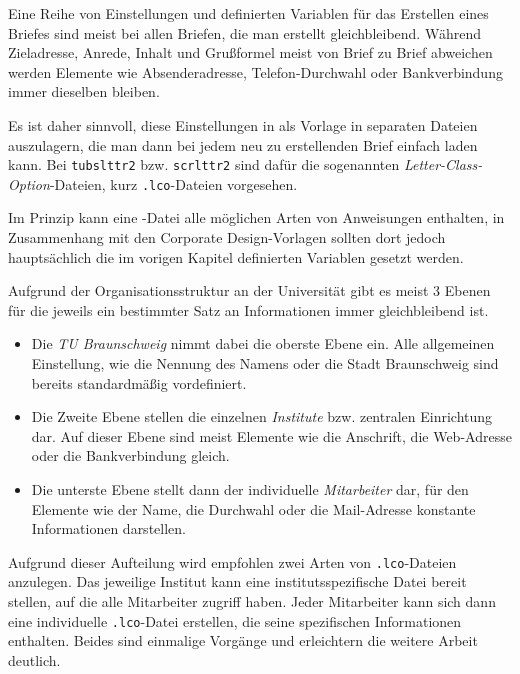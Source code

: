 Eine Reihe von Einstellungen und definierten Variablen für das Erstellen eines
Briefes sind meist bei allen Briefen, die man erstellt gleichbleibend.
Während Zieladresse, Anrede, Inhalt und Grußformel meist von Brief zu Brief
abweichen werden Elemente wie Absenderadresse, Telefon-Durchwahl oder
Bankverbindung immer dieselben bleiben.

Es ist daher sinnvoll, diese Einstellungen in als Vorlage in separaten Dateien
auszulagern, die man dann bei jedem neu zu erstellenden Brief einfach laden
kann. Bei \texttt{tubslttr2} bzw. \texttt{scrlttr2} sind dafür die sogenannten
\emph{Letter-Class-Option}-Dateien, kurz \texttt{.lco}-Dateien vorgesehen.

Im Prinzip kann eine -Datei alle möglichen Arten von Anweisungen
enthalten, in Zusammenhang mit den Corporate Design-Vorlagen sollten dort jedoch
hauptsächlich die im vorigen Kapitel definierten Variablen gesetzt werden.

Aufgrund der Organisationsstruktur an der Universität gibt es meist 3 Ebenen für
die jeweils ein bestimmter Satz an Informationen immer gleichbleibend ist.

\begin{itemize}
  \item Die \emph{TU Braunschweig} nimmt dabei die oberste Ebene ein. Alle allgemeinen
    Einstellung, wie die Nennung des Namens oder die Stadt Braunschweig sind
    bereits standardmäßig vordefiniert.

  \item Die Zweite Ebene stellen die einzelnen \emph{Institute} bzw.
    zentralen Einrichtung dar. Auf dieser Ebene sind meist Elemente wie die
    Anschrift, die Web-Adresse oder die Bankverbindung gleich.

  \item Die unterste Ebene stellt dann der individuelle \emph{Mitarbeiter} dar,
    für den Elemente wie der Name, die Durchwahl oder die Mail-Adresse konstante
    Informationen darstellen.
\end{itemize}

Aufgrund dieser Aufteilung wird empfohlen zwei Arten von \texttt{.lco}-Dateien
anzulegen. Das jeweilige Institut kann eine institutsspezifische Datei
bereit stellen, auf die alle Mitarbeiter zugriff haben. Jeder Mitarbeiter kann
sich dann eine individuelle \texttt{.lco}-Datei erstellen, die seine spezifischen
Informationen enthalten. Beides sind einmalige Vorgänge und erleichtern die
weitere Arbeit deutlich.

